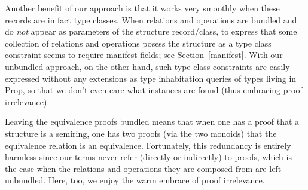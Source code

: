 \documentclass[a4paper,10pt, runningheads]{llncs}
\begin{document}
% 

Another benefit of our approach is that it works very smoothly when these records are in fact type
classes. When relations and operations are bundled and do \emph{not} appear as parameters of the
structure record/class, to express that some collection of relations and
operations posess the structure as a type class constraint seems to require manifest fields; see
Section~\ref{manifest}. With
our unbundled approach, on the other hand, such type class constraints are easily expressed without
any extensions as type inhabitation queries
of types living in Prop, so that we don't even care what instances are found (thus embracing proof
irrelevance).

Leaving the equivalence proofs bundled means that when one has a proof that a structure
is a semiring, one has two proofs (via the two monoids) that the equivalence relation is an
equivalence. Fortunately, this redundancy is entirely harmless since our terms
never refer (directly or indirectly) to proofs, which is the case when the relations and operations
they are composed from are left unbundled. Here, too, we enjoy the warm embrace of proof
irrelevance.
\end{document}
